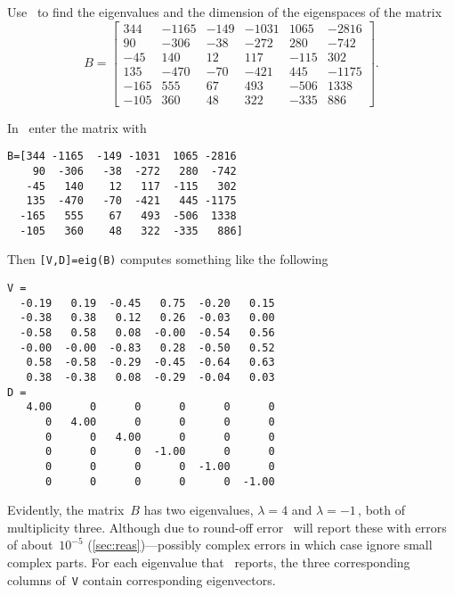 \begin{example} \label{eg:}
Use \script\ to find the eigenvalues and the dimension of the eigenspaces of the matrix 
\begin{equation*}
B=\begin{bmatrix} 344&-1165&-149&-1031&1065&-2816
\\90&-306&-38&-272&280&-742
\\-45&140&12&117&-115&302
\\135&-470&-70&-421&445&-1175
\\-165&555&67&493&-506&1338
\\-105&360&48&322&-335&886 \end{bmatrix}.
\end{equation*}

\begin{solution} 
In \script\ enter the matrix with
\begin{verbatim}
B=[344 -1165  -149 -1031  1065 -2816
    90  -306   -38  -272   280  -742
   -45   140    12   117  -115   302
   135  -470   -70  -421   445 -1175
  -165   555    67   493  -506  1338
  -105   360    48   322  -335   886]
\end{verbatim}
\setbox\ajrqrbox\hbox{}%
\marginpar{\usebox{\ajrqrbox}}%
Then \verb|[V,D]=eig(B)| computes something like the following \twodp
\begin{verbatim}
V =
  -0.19   0.19  -0.45   0.75  -0.20   0.15
  -0.38   0.38   0.12   0.26  -0.03   0.00
  -0.58   0.58   0.08  -0.00  -0.54   0.56
  -0.00  -0.00  -0.83   0.28  -0.50   0.52
   0.58  -0.58  -0.29  -0.45  -0.64   0.63
   0.38  -0.38   0.08  -0.29  -0.04   0.03
D =
   4.00      0      0      0      0      0
      0   4.00      0      0      0      0
      0      0   4.00      0      0      0
      0      0      0  -1.00      0      0
      0      0      0      0  -1.00      0
      0      0      0      0      0  -1.00
\end{verbatim}
Evidently, the matrix~\(B\) has two eigenvalues, \(\lambda=4\) and \(\lambda=-1\)\,, both of multiplicity three.
Although due to round-off error \script\ will report these with errors of about~\(10^{-5}\) (\autoref{sec:reas})---possibly complex errors in which case ignore small complex parts.
For each eigenvalue that \script\ reports, the three corresponding columns of~\verb|V| contain corresponding eigenvectors.

\end{solution}
\end{example}
